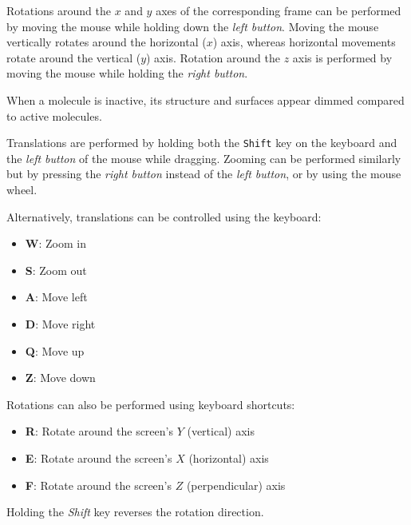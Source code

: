 \documentclass[10pt]{article}
\begin{document}
\vspace*{5mm}{\bf Rotations and Translations}\vspace*{5mm}  

Rotations  
around the $x$ and $y$ axes of the corresponding frame can be performed  
by moving the mouse while holding down the {\it left button}.  
Moving the mouse vertically rotates around the horizontal ($x$) axis,  
whereas horizontal movements rotate around the vertical ($y$) axis.  
Rotation around the $z$ axis is performed by moving the mouse while holding the {\it right button}.  

When a molecule is inactive, its structure and surfaces appear dimmed compared to active molecules.  

Translations  
are performed by holding both the \texttt{Shift} key on the keyboard and the {\it left button}  
of the mouse while dragging.  
Zooming can be performed similarly but by pressing  
the {\it right button} instead of the {\it left button}, or by using the mouse wheel.  

Alternatively, translations can be controlled using the keyboard:  
\begin{itemize}
    \item {\bf W}: Zoom in  
    \item {\bf S}: Zoom out  
    \item {\bf A}: Move left  
    \item {\bf D}: Move right  
    \item {\bf Q}: Move up  
    \item {\bf Z}: Move down  
\end{itemize}

Rotations can also be performed using keyboard shortcuts:  
\begin{itemize}
    \item {\bf R}: Rotate around the screen’s $Y$ (vertical) axis  
    \item {\bf E}: Rotate around the screen’s $X$ (horizontal) axis  
    \item {\bf F}: Rotate around the screen’s $Z$ (perpendicular) axis  
\end{itemize}

Holding the {\it Shift} key reverses the rotation direction.  

\vspace*{5mm}{\bf Alternative Methods for Transformations}\vspace*{5mm}  
\end{document}
